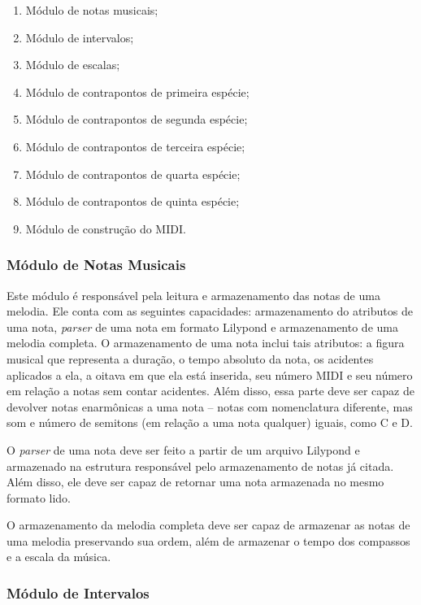     \begin{enumerate}
      \item Módulo de notas musicais;
      \item Módulo de intervalos;
      \item Módulo de escalas;
      \item Módulo de contrapontos de primeira espécie;
      \item Módulo de contrapontos de segunda espécie;
      \item Módulo de contrapontos de terceira espécie;
      \item Módulo de contrapontos de quarta espécie;
      \item Módulo de contrapontos de quinta espécie;
      \item Módulo de construção do MIDI.
    \end{enumerate}

    \subsubsection[Módulo de Notas Musicais]{Módulo de Notas Musicais}

      Este módulo é responsável pela leitura e armazenamento das notas de uma melodia. Ele conta com as seguintes capacidades: armazenamento do atributos de uma nota, \textit{parser} de uma nota em formato Lilypond e armazenamento de uma melodia completa. O armazenamento de uma nota inclui tais atributos: a figura musical que representa a duração, o tempo absoluto da nota, os acidentes aplicados a ela, a oitava em que ela está inserida, seu número MIDI e seu número em relação a notas sem contar acidentes. Além disso, essa parte deve ser capaz de devolver notas enarmônicas a uma nota -- notas com nomenclatura diferente, mas som e número de semitons (em relação a uma nota qualquer) iguais, como C\sh{}  e D\fl.

      O \textit{parser} de uma nota deve ser feito a partir de um arquivo Lilypond e armazenado na estrutura responsável pelo armazenamento de notas já citada. Além disso, ele deve ser capaz de retornar uma nota armazenada no mesmo formato lido.

      O armazenamento da melodia completa deve ser capaz de armazenar as notas de uma melodia preservando sua ordem, além de armazenar o tempo dos compassos e a escala da música.

    \subsubsection[Módulo de Intervalos]{Módulo de Intervalos}

